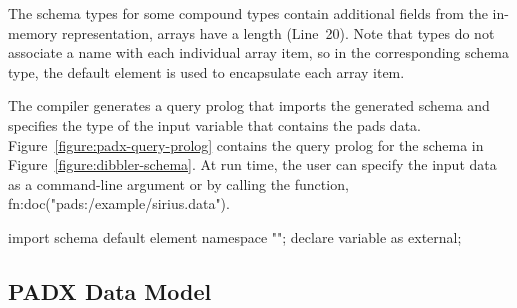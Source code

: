 The schema types for some compound types contain additional fields
from the \pads{} in-memory representation, \eg{} arrays have a length
(Line~20).  Note that  types do not associate a name with
each individual array item, so in the corresponding schema type, the
default element  is used to encapsulate each array item.

The \pads{} compiler generates a query prolog that imports the
generated schema and specifies the type of the input variable that
contains the pads data.  Figure~\ref{figure:padx-query-prolog}
contains the query prolog for the schema in
Figure~\ref{figure:dibbler-schema}.  At run time, the user can specify
the input data as a command-line argument or by calling the
 function, \eg{} fn:doc("pads:/example/sirius.data").
\begin{figure*}
\begin{small}
\begin{code}
import schema default element namespace "";
declare variable  as  external; 
\end{code}
\end{small}
\caption{\padx{} generated query prolog}
\label{figure:padx-query-prolog}
\end{figure*}

\subsection{PADX Data Model}









